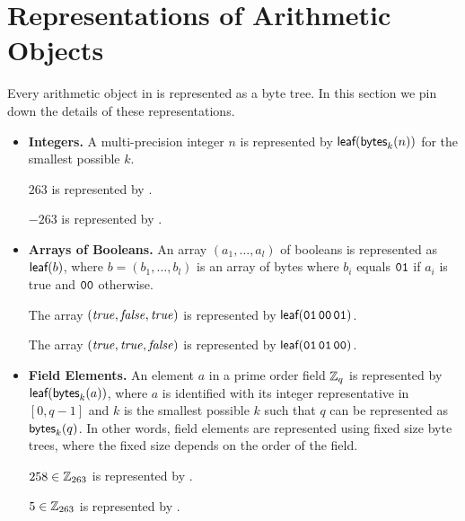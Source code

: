\documentclass[11pt]{article}
\begin{document}
\section{Representations of Arithmetic Objects}\label{sect:arithmetic}

Every arithmetic object in \veri is represented as a byte tree. In
this section we pin down the details of these representations.
\begin{itemize}

\item\textbf{Integers.} A multi-precision integer $n$ is represented
  by $\textsf{leaf}(\textsf{bytes}_{k}(n))$ for the smallest possible $k$.

  \begin{example}
    $263$ is represented by
    .
  \end{example}
  \begin{example}
    $-263$ is represented by
    .
  \end{example}

\item\textbf{Arrays of Booleans.} An array $(a_1,\ldots,a_l)$ of
  booleans is represented as $\textsf{leaf}(b)$, where $b=(b_1,\ldots,b_l)$ is
  an array of bytes where $b_i$ equals $\texttt{01}$ if $a_i$ is true and
  $\texttt{00}$ otherwise.

  \begin{example}
    The array $(\mathit{true},\mathit{false},\mathit{true})$ is represented by
    $\textsf{leaf}(\texttt{01\hspace{1.5pt}00\hspace{1.5pt}01})$.
  \end{example}
  \begin{example}
    The array $(\mathit{true},\mathit{true},\mathit{false})$ is represented by
    $\textsf{leaf}(\texttt{01\hspace{1.5pt}01\hspace{1.5pt}00})$.
  \end{example}

\item\textbf{Field Elements.} An element $a$ in a prime order field
  $\mathbb{Z}_{q}$ is represented by $\textsf{leaf}(\textsf{bytes}_{k}(a))$, where $a$ is
  identified with its integer representative in $[0,q-1]$ and $k$ is
  the smallest possible $k$ such that $q$ can be represented as
  $\textsf{bytes}_{k}(q)$. In other words, field elements are represented
  using fixed size byte trees, where the fixed size depends on the
  order of the field.

  \begin{example}
    $258\in\mathbb{Z}_{263}$ is represented by
    .
  \end{example}
  \begin{example}
    $5\in\mathbb{Z}_{263}$ is represented by
    .
  \end{example}


\end{itemize}
\end{document}

